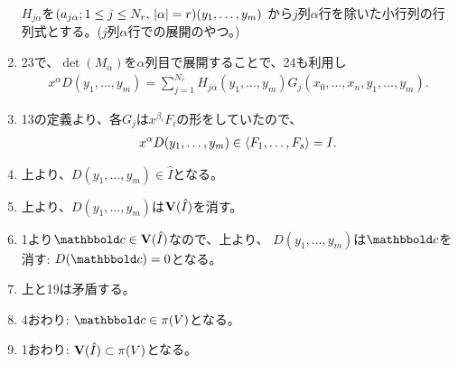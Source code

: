\begin{myproof}
\begin{enumerate}
    $H_{j\alpha}$を${(a_{j\alpha}; 1\le j\le N_r, \, \left|\alpha\right|=r)(y_1,\dots,y_m)}$
    から$j$列$\alpha$行を除いた小行列の行列式とする。($j$列$\alpha$行での展開のやつ。)
    \item 23で、$\det(M_\alpha)$を$\alpha$列目で展開することで、24も利用し
    \begin{align}
      x^\alpha D(y_1,\dots,y_m)
      =
      \sum_{j=1}^{N_r} H_{j\alpha}(y_1,\dots,y_m) G_j(x_0,\dots,x_n,y_1,\dots,y_m).
    \end{align}
    \item
    13の定義より、各$G_j$は$x^{\beta_i}F_i$の形をしていたので、
    \begin{align}
      x^\alpha D(y_1,\dots,y_m)
      \in
      \left\langle F_1,\dots,F_s \right\rangle = I.
    \end{align}
    \item
    上より、$D(y_1,\dots,y_m)\in \hat I$となる。
    \item 上より、$D(y_1,\dots,y_m)$は$\textbf V(\hat I)$を消す。
    \item 1より$\bbold c \in \var(\hat I)$なので、上より、
    $D(y_1,\dots,y_m)$は$\bbold c$を消す: $D(\bbold c) = 0$となる。
    \item 上と19は矛盾する。
    \item 4おわり: $\bbold c \in \pi(V)$となる。
    \item 1おわり: $\textbf V(\hat I) \subset \pi(V)$となる。
   \end{enumerate}
\end{myproof}

